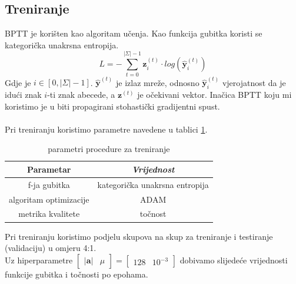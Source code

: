 \documentclass[conference]{IEEEtran}
\begin{document}
\subsection{Treniranje} \label{subsect:trening}
BPTT je korišten kao algoritam učenja.
Kao funkcija gubitka koristi se kategorička unakrsna entropija.
\begin{equation}
L = - \sum_{t = 0}^{\lvert \Sigma \rvert-1} \mathbf{z}_i^{(t)} \cdot log(\hat{\mathbf{y}}_i^{(t)})
\end{equation}
Gdje je $i \in [0, \lvert \Sigma \rvert - 1]$. $\hat{\mathbf{y}}^{(t)}$ je izlaz mreže, odnosno $\hat{\mathbf{y}}_i^{(t)}$ vjerojatnost da je idući znak $i$-ti znak abecede, a $\mathbf{z}^{(t)}$ je očekivani vektor.
Inačica BPTT koju mi koristimo je u biti propagirani stohastički gradijentni spust.\\
\\
Pri treniranju koristimo parametre navedene u tablici \ref{tab:trening}.
\begin{table}[htbp]
\caption{parametri procedure za treniranje}
\begin{center}
\begin{tabular}{|c|c|}
\hline
\textbf{Parametar} & \textbf{\textit{Vrijednost}}\\ \hline
f-ja gubitka & kategorička unakrsna entropija \\ \hline
algoritam optimizacije & ADAM \\ \hline
metrika kvalitete & točnost \\ \hline
\end{tabular}
\label{tab:trening}
\end{center}
\end{table}

Pri treniranju koristimo podjelu skupova na skup za treniranje i testiranje (validaciju) u omjeru 4:1.\\
Uz hiperparametre $\begin{bmatrix} \lvert \mathbf{a} \rvert & \mu\end{bmatrix} = \begin{bmatrix} 128 & 10^{-3}  \end{bmatrix}$ dobivamo slijedeće vrijednosti funkcije gubitka i točnosti po epohama.
\end{document}
